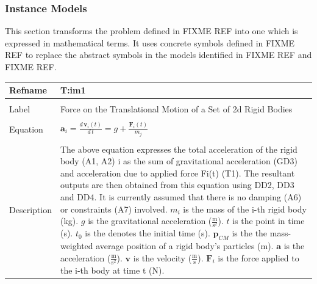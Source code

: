 \documentclass[12pt]{article}
\begin{document}
\subsubsection{Instance Models}
\label{Sec:IMs}
This section transforms the problem defined in FIXME REF into one which is expressed in mathematical terms. It uses concrete symbols defined in FIXME REF to replace the abstract symbols in the models identified in FIXME REF and FIXME REF.
~\newline
\noindent \begin{minipage}{\textwidth}
\begin{tabular}{p{} p{}}
\toprule \textbf{Refname} & \textbf{T:im1}
\label{T:im1}
\\ \midrule \\
Label & Force on the Translational Motion of a Set of 2d Rigid Bodies
\\ \midrule \\
Equation & ${\mathbf{a}_{i}}=\frac{d\,{\mathbf{v}_{i}}\left(t\right)}{d\,t}=g+\frac{{\mathbf{F}_{i}}\left(t\right)}{{m_{j}}}$
\\ \midrule \\
Description & The above equation expresses the total acceleration of the rigid body (A1, A2) i as the sum of gravitational acceleration (GD3) and acceleration due to applied force Fi(t) (T1). The resultant outputs are then obtained from this equation using DD2, DD3 and DD4. It is currently assumed that there is no damping (A6) or constraints (A7) involved. ${m_{i}}$ is the mass of the i-th rigid body (kg). $g$ is the gravitational acceleration ($\frac{\text{m}}{\text{s}^{2}}$). $t$ is the point in time (s). ${t_{0}}$ is the denotes the initial time (s). ${\mathbf{p}_{CM}}$ is the the mass-weighted average position of a rigid body's particles (m). $\mathbf{a}$ is the acceleration ($\frac{\text{m}}{\text{s}^{2}}$). $\mathbf{v}$ is the velocity ($\frac{\text{m}}{\text{s}}$). ${\mathbf{F}_{i}}$ is the force applied to the i-th body at time t (N).
\\ \bottomrule \end{tabular}
\end{minipage}\\
~\newline
\end{document}
